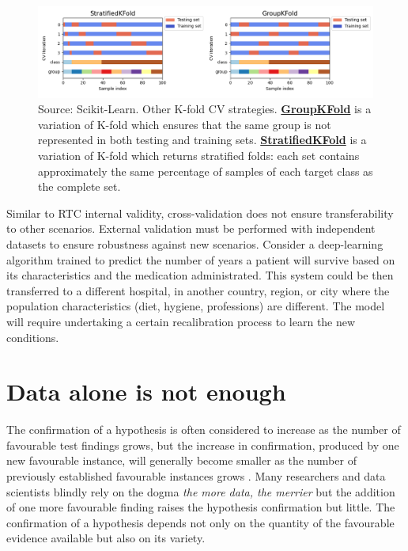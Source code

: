 \documentclass[
]{book}
\begin{document}
\begin{figure}

{\centering \includegraphics[width=1\linewidth]{Figures/kfold-strategies} 

}

\caption{Source: Scikit-Learn. Other K-fold CV strategies. \href{https://scikit-learn.org/stable/modules/cross_validation.html\#group-k-fold}{\textbf{GroupKFold}} is a variation of K-fold which ensures that the same group is not represented in both testing and training sets. \href{https://scikit-learn.org/stable/modules/cross_validation.html\#stratified-k-fold}{\textbf{StratifiedKFold}} is a variation of K-fold which returns stratified folds: each set contains approximately the same percentage of samples of each target class as the complete set.}\label{fig:k-fold-strategies}
\end{figure}

Similar to RTC internal validity, cross-validation does not ensure transferability to other scenarios. External validation must be performed with independent datasets to ensure robustness against new scenarios. Consider a deep-learning algorithm trained to predict the number of years a patient will survive based on its characteristics and the medication administrated. This system could be then transferred to a different hospital, in another country, region, or city where the population characteristics (diet, hygiene, professions) are different. The model will require undertaking a certain recalibration process to learn the new conditions.

\hypertarget{data-is-not-enough}{%
\section{Data alone is not enough}\label{data-is-not-enough}}

The confirmation of a hypothesis is often considered to increase as the number of favourable test findings grows, but the increase in confirmation, produced by one new favourable instance, will generally become smaller as the number of previously established favourable instances grows \citep{hempel-pos}. Many researchers and data scientists blindly rely on the dogma \emph{the more data, the merrier} but the addition of one more favourable finding raises the hypothesis confirmation but little. The confirmation of a hypothesis depends not only on the quantity of the favourable evidence available but also on its variety.
\end{document}
